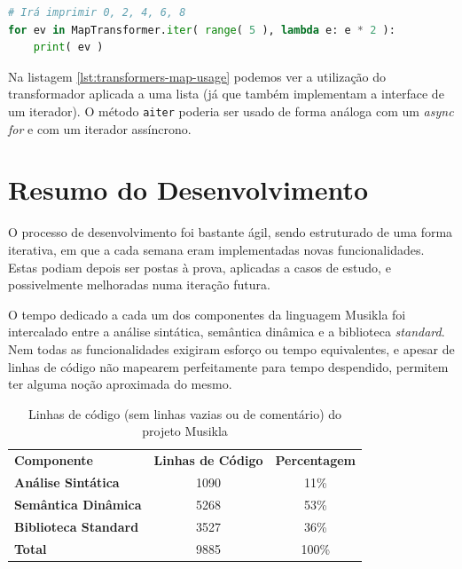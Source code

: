 \begin{lstlisting}[caption={Exemplo de um transformador \texttt{map} e da sua utilização},label={lst:transformers-map-usage},language=Python]
# Irá imprimir 0, 2, 4, 6, 8
for ev in MapTransformer.iter( range( 5 ), lambda e: e * 2 ):
    print( ev )
\end{lstlisting}

Na listagem \ref{lst:transformers-map-usage} podemos ver a utilização do transformador aplicada a uma lista (já que também implementam a interface de um iterador). O método \texttt{aiter} poderia ser usado de forma análoga com um \textit{async for} e com um iterador assíncrono.


\section{Resumo do Desenvolvimento}
O processo de desenvolvimento foi bastante ágil, sendo estruturado de uma forma iterativa, em que a cada semana eram implementadas novas funcionalidades. Estas podiam depois ser postas à prova, aplicadas a casos de estudo, e possivelmente melhoradas numa iteração futura.

O tempo dedicado a cada um dos componentes da linguagem Musikla foi intercalado entre a análise sintática, semântica dinâmica e a biblioteca \textit{standard}. Nem todas as funcionalidades exigiram esforço ou tempo equivalentes, e apesar de linhas de código não mapearem perfeitamente para tempo despendido, permitem ter alguma noção aproximada do mesmo.

\begin{table}[h]
\centering
\def\arraystretch{1.3}
\begin{tabular}{lcc}
\rowcolor[HTML]{EFEFEF} 
\textbf{Componente}          & \multicolumn{1}{l}{\cellcolor[HTML]{EFEFEF}\textbf{Linhas de Código}} & \multicolumn{1}{l}{\cellcolor[HTML]{EFEFEF}\textbf{Percentagem}} \\
\textbf{Análise Sintática}   & 1090                                                                  & 11\%                                                             \\
\textbf{Semântica Dinâmica}  & 5268                                                                  & 53\%                                                             \\
\textbf{Biblioteca Standard} & 3527                                                                  & 36\%                                                             \\ \hline
\textbf{Total}               & 9885                                                                  & 100\%                                                           
\end{tabular}
\caption{Linhas de código (sem linhas vazias ou de comentário) do projeto Musikla}
\label{tab:loc}
\end{table}

